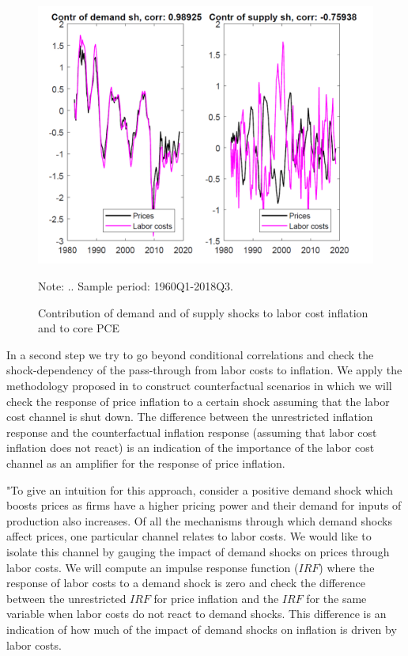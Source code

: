 \documentclass[11pt]{article}
\begin{document}
\begin{figure}
\begin{center}
\caption{Contribution of demand and of supply shocks to labor cost inflation and to core PCE}\label{fig:2ShockVAR_Correlation}
\includegraphics[scale = .5]{US_2shockVAR_Contrib.png}
\begin{minipage}{\textwidth} {\footnotesize
Note: ..
Sample period: 1960Q1-2018Q3.\par}
\end{minipage}
\end{center}
\end{figure}

In a second step we try to go beyond conditional correlations and check the shock-dependency of the pass-through from labor costs to inflation. We apply the methodology proposed in \cite{BCV19} to construct counterfactual scenarios in which we will check the response of price inflation to a certain shock assuming that the labor cost channel is shut down. The difference between the unrestricted inflation response and the counterfactual inflation response (assuming that labor cost inflation does not react) is an indication of the importance of the labor cost channel as an amplifier for the response of price inflation. 


"To give an intuition for this approach, consider a positive demand shock which boosts prices as firms have a higher pricing power and their demand for inputs of production also increases. Of all the mechanisms through which demand shocks affect prices, one particular channel relates to labor costs. We would like to isolate this channel by gauging the impact of demand shocks on prices through labor costs. We will compute an impulse response function ($IRF$) where the response of labor costs to a demand shock is zero and check the difference between the unrestricted $IRF$ for price inflation and the $IRF$ for the same variable when labor costs do not react to demand shocks. This difference is an indication of how much of the impact of demand shocks on inflation is driven by labor costs.
\end{document}
